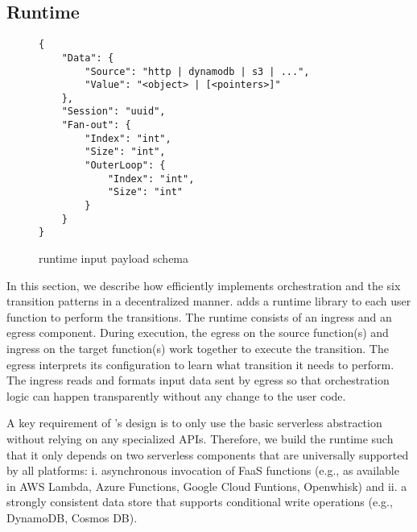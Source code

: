 \subsection{\name{} Runtime}\label{sec:runtime}


\begin{figure}[]
    \begin{verbatim}
{
    "Data": {
        "Source": "http | dynamodb | s3 | ...",
        "Value": "<object> | [<pointers>]"
    },
    "Session": "uuid",
    "Fan-out": {
        "Index": "int",
        "Size": "int",
        "OuterLoop": {
            "Index": "int",
            "Size": "int"
        }
    }
}
    \end{verbatim}
    \caption{\name{} runtime input payload schema}
    \label{fig:input-format}
\end{figure}


In this section, we describe how \name{} efficiently implements orchestration
and the six transition patterns in a decentralized manner. \name{} adds a
runtime library to each  user function to perform the transitions. The \name{}
runtime consists of an ingress and an egress component. During execution, the
egress on the source function(s) and ingress on the target function(s) work
together to execute the transition. The egress interprets its \name{}
configuration to learn what transition it needs to perform. The ingress reads
and formats input data sent by egress so that
\name{} orchestration logic can happen transparently without any change to the
user code.

A key requirement of \name{}'s design is to only use the basic serverless
abstraction without relying on any specialized APIs. Therefore, we build the
runtime such that it only depends on two serverless components that are
universally supported by all platforms: i.
asynchronous invocation of FaaS functions (e.g., as available in AWS Lambda, Azure Functions,
Google Cloud Funtions, Openwhisk) and ii. a strongly consistent data store
that supports conditional write operations (e.g., DynamoDB, Cosmos DB).

